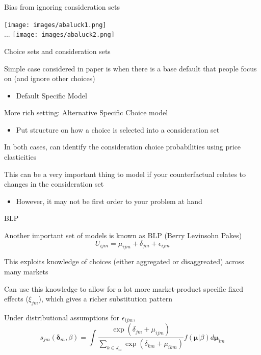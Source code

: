 \documentclass[notes,11pt, aspectratio=169]{beamer}
\newenvironment{wideitemize}{\itemize\addtolength{\itemsep}{10pt}}{\enditemize}
\begin{document}
\begin{frame}{Bias from ignoring consideration sets}
  \begin{center}
  \texttt{[image: images/abaluck1.png]}\\
  ...
  \texttt{[image: images/abaluck2.png]}  
\end{center}
\end{frame}
\begin{frame}{Choice sets and consideration sets}
  \begin{wideitemize}
  \item Simple case considered in paper is when there is a base
    default that people focus on (and ignore other choices)
    \begin{itemize}
    \item Default Specific Model
    \end{itemize}
  \item More rich setting: Alternative Specific Choice model
    \begin{itemize}
    \item Put structure on how a choice is selected into a consideration set
    \end{itemize}
  \item In both cases, can identify the consideration choice
    probabilities using price elasticities
  \item This can be a very important thing to model if your
    counterfactual relates to changes in the consideration set
    \begin{itemize}
    \item However, it may not be first order to your problem at hand
    \end{itemize}
  \end{wideitemize}
\end{frame}

\begin{frame}{BLP}
  \begin{wideitemize}
  \item Another important set of models is known as BLP (Berry
    Levinsohn Pakes)
    $$ U_{ijm} = \mu_{ijm} + \delta_{jm} + \epsilon_{ijm}$$
  \item This exploits knowledge of choices (either aggregated or
    disaggreated) across many markets
  \item Can use this knowledge to allow for a lot more market-product
    specific fixed effects ($\xi_{jm}$), which gives a richer
    substitution pattern
  \item Under distributional assumptions for $\epsilon_{ijm}$,
    \begin{equation}
      s_{jm}(\boldsymbol{\delta}_{m}, \beta) = \int \frac{\exp(\delta_{jm} + \mu_{ijm})}{\sum_{k \in J_{m}} \exp(\delta_{km} + \mu_{ikm})} f(\boldsymbol{\mu}|\beta) d \boldsymbol{\mu}_{im}
    \end{equation}
  \end{wideitemize}
\end{frame}
\end{document}
